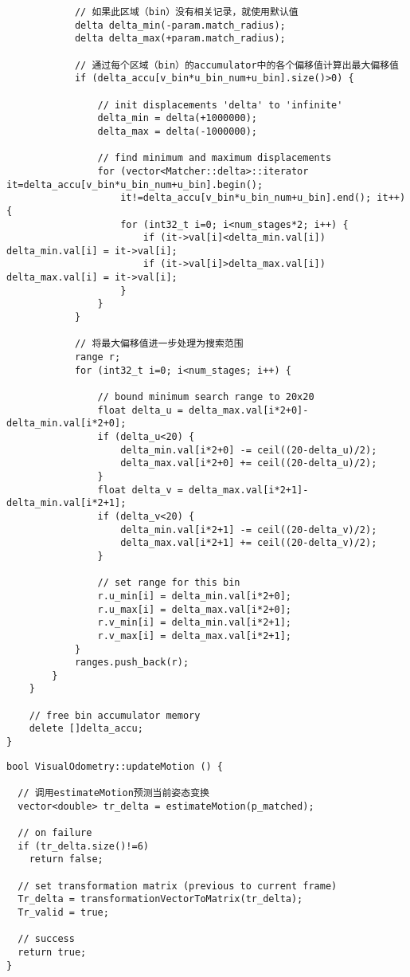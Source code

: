 \documentclass[UTF8]{ctexart}
\begin{document}
\begin{verbatim}
            // 如果此区域（bin）没有相关记录，就使用默认值
            delta delta_min(-param.match_radius);
            delta delta_max(+param.match_radius);
            
            // 通过每个区域（bin）的accumulator中的各个偏移值计算出最大偏移值
            if (delta_accu[v_bin*u_bin_num+u_bin].size()>0) {
                
                // init displacements 'delta' to 'infinite'
                delta_min = delta(+1000000);
                delta_max = delta(-1000000);
                
                // find minimum and maximum displacements
                for (vector<Matcher::delta>::iterator it=delta_accu[v_bin*u_bin_num+u_bin].begin();
                    it!=delta_accu[v_bin*u_bin_num+u_bin].end(); it++) {
                    for (int32_t i=0; i<num_stages*2; i++) {
                        if (it->val[i]<delta_min.val[i]) delta_min.val[i] = it->val[i];
                        if (it->val[i]>delta_max.val[i]) delta_max.val[i] = it->val[i];
                    }
                }
            }
        
            // 将最大偏移值进一步处理为搜索范围
            range r;
            for (int32_t i=0; i<num_stages; i++) {
                
                // bound minimum search range to 20x20
                float delta_u = delta_max.val[i*2+0]-delta_min.val[i*2+0];
                if (delta_u<20) {
                    delta_min.val[i*2+0] -= ceil((20-delta_u)/2);
                    delta_max.val[i*2+0] += ceil((20-delta_u)/2);
                }
                float delta_v = delta_max.val[i*2+1]-delta_min.val[i*2+1];
                if (delta_v<20) {
                    delta_min.val[i*2+1] -= ceil((20-delta_v)/2);
                    delta_max.val[i*2+1] += ceil((20-delta_v)/2);
                }
                
                // set range for this bin
                r.u_min[i] = delta_min.val[i*2+0];
                r.u_max[i] = delta_max.val[i*2+0];
                r.v_min[i] = delta_min.val[i*2+1];
                r.v_max[i] = delta_max.val[i*2+1];
            }
            ranges.push_back(r);      
        }
    }
    
    // free bin accumulator memory
    delete []delta_accu;
}
    \end{verbatim}
    \begin{verbatim}
bool VisualOdometry::updateMotion () {
  
  // 调用estimateMotion预测当前姿态变换
  vector<double> tr_delta = estimateMotion(p_matched);
  
  // on failure
  if (tr_delta.size()!=6)
    return false;
  
  // set transformation matrix (previous to current frame)
  Tr_delta = transformationVectorToMatrix(tr_delta);
  Tr_valid = true;
  
  // success
  return true;
}
    \end{verbatim}
\end{document}
